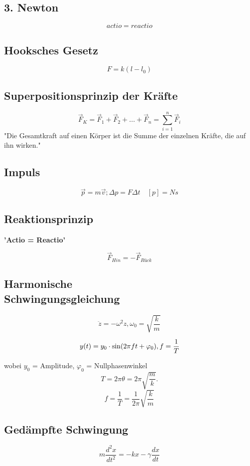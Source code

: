 \documentclass{article}
\begin{document}
\begin{multicols*}{3}
  \subsection{3. Newton}
  $$actio = reactio$$

  \subsection{Hooksches Gesetz}
  $$F = k(l - l_0)$$

  \subsection{Superpositionsprinzip der Kräfte}
  $$\vec{F}_K = \vec{F}_1 + \vec{F}_2 + ... + \vec{F}_n = \sum_{i=1}^{n} \vec{F}_i$$
  "Die Gesamtkraft auf einen Körper ist die Summe der einzelnen Kräfte, die auf
  ihn wirken."

  \subsection{Impuls}
  $$\vec{p} = m\vec{v}; \Delta p = F\Delta t  \quad [p] = Ns$$

  \subsection{Reaktionsprinzip}

  \textbf{'Actio = Reactio'}

  $$\vec{F}_{Hin} = -\vec{F}_{Rück}$$

  \subsection{Harmonische\\ Schwingungsgleichung}
  $$\ddot{z}=-\omega ^2 z,\omega_0=\sqrt{\frac{k}{m}}$$

  $$y(t)=y_0\cdot\sin(2\pi f t+\varphi_0), f = {1 \over T}$$

  wobei $y_0$ = Amplitude, $\varphi_0$ = Nullphasenwinkel\\

  $$T = 2\pi\theta =2\pi {\sqrt {\frac {m}{k}}}.$$
  $$f = \frac{1}{T} = {\frac {1}{2\pi }}{\sqrt {\frac {k}{m}}}$$

  \subsection{Gedämpfte Schwingung}
  $$m\frac{d^2x}{dt^2} = -kx - \gamma\frac{dx}{dt}$$


\end{multicols*}
\end{document}
